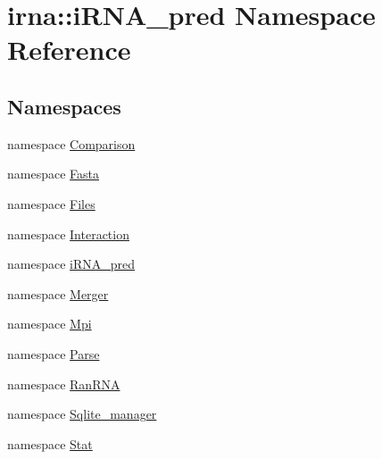 \hypertarget{namespaceirna_1_1iRNA__pred}{
\section{irna\-:\-:i\-R\-N\-A\-\_\-pred \-Namespace \-Reference}
\label{namespaceirna_1_1iRNA__pred}
}
\subsection*{\-Namespaces}
\begin{DoxyCompactItemize}
\item 
namespace \hyperlink{namespaceirna_1_1iRNA__pred_1_1Comparison}{\-Comparison}
\item 
namespace \hyperlink{namespaceirna_1_1iRNA__pred_1_1Fasta}{\-Fasta}
\item 
namespace \hyperlink{namespaceirna_1_1iRNA__pred_1_1Files}{\-Files}
\item 
namespace \hyperlink{namespaceirna_1_1iRNA__pred_1_1Interaction}{\-Interaction}
\item 
namespace \hyperlink{namespaceirna_1_1iRNA__pred_1_1iRNA__pred}{i\-R\-N\-A\-\_\-pred}
\item 
namespace \hyperlink{namespaceirna_1_1iRNA__pred_1_1Merger}{\-Merger}
\item 
namespace \hyperlink{namespaceirna_1_1iRNA__pred_1_1Mpi}{\-Mpi}
\item 
namespace \hyperlink{namespaceirna_1_1iRNA__pred_1_1Parse}{\-Parse}
\item 
namespace \hyperlink{namespaceirna_1_1iRNA__pred_1_1RanRNA}{\-Ran\-R\-N\-A}
\item 
namespace \hyperlink{namespaceirna_1_1iRNA__pred_1_1Sqlite__manager}{\-Sqlite\-\_\-manager}
\item 
namespace \hyperlink{namespaceirna_1_1iRNA__pred_1_1Stat}{\-Stat}
\end{DoxyCompactItemize}
